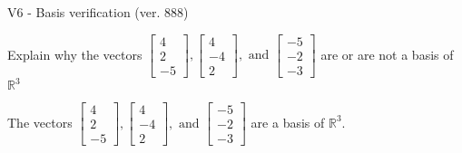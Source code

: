 \begin{exercise}
  \begin{exerciseTitle}V6 - Basis verification (ver. 888)\end{exerciseTitle}
  \begin{exerciseStatement}
    Explain why the vectors \(\left[\begin{array}{r}
4 \\
2 \\
-5
\end{array}\right] , \left[\begin{array}{r}
4 \\
-4 \\
2
\end{array}\right] , \text{ and } \left[\begin{array}{r}
-5 \\
-2 \\
-3
\end{array}\right]\) are or are not a basis of \(\mathbb{R}^3\)	


  \end{exerciseStatement}
  \begin{exerciseAnswer}
   The vectors \(\left[\begin{array}{r}
4 \\
2 \\
-5
\end{array}\right] , \left[\begin{array}{r}
4 \\
-4 \\
2
\end{array}\right] , \text{ and } \left[\begin{array}{r}
-5 \\
-2 \\
-3
\end{array}\right]\) 
  	 are  a basis of \(\mathbb{R}^3\).
  


  \end{exerciseAnswer}
\end{exercise}